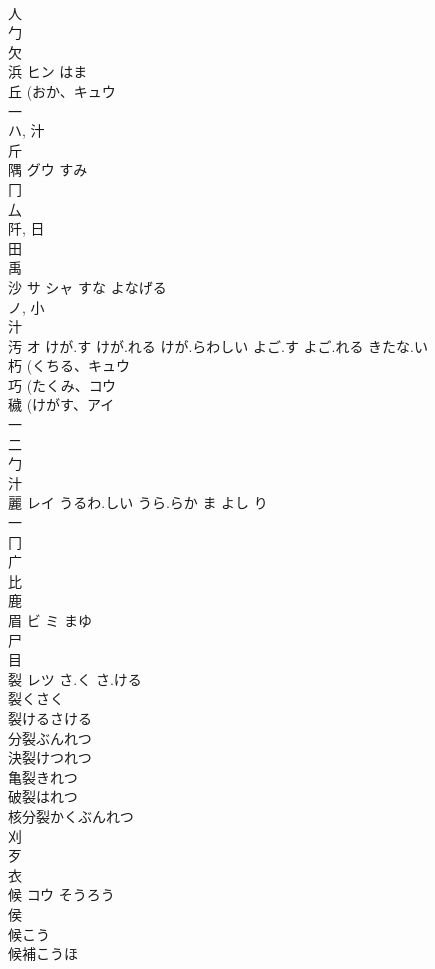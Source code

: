 \documentclass[8pt]{extreport}
\begin{document}
\begin{CJK}{UTF8}{min}
\\	人 
\\	勹 
\\	欠 
\\	浜	ヒン	はま	
\\	丘 (おか、キュウ 
\\	一 
\\	ハ, 汁 
\\	斤 
\\	隅	グウ	すみ	
\\	冂 
\\	厶 
\\	阡, 日 
\\	田 
\\	禹 
\\	沙	サ シャ	すな よなげる	
\\	ノ, 小 
\\	汁 
\\	汚	オ	けが.す けが.れる けが.らわしい よご.す よご.れる きたな.い	
\\	朽 (くちる、キュウ 
\\	巧 (たくみ、コウ 
\\	穢 (けがす、アイ 
\\	一 
\\	二 
\\	勹 
\\	汁 
\\	麗	レイ	うるわ.しい うら.らか ま よし り	
\\	一 
\\	冂 
\\	广 
\\	比 
\\	鹿 
\\	眉	ビ ミ	まゆ	
\\	尸 
\\	目 
\\	裂	レツ	さ.く さ.ける	
\\	裂くさく
\\	裂けるさける
\\	分裂ぶんれつ
\\	決裂けつれつ
\\	亀裂きれつ
\\	破裂はれつ
\\	核分裂かくぶんれつ
\\	刈 
\\	歹 
\\	衣 
\\	候	コウ	そうろう	
\\	侯 
\\	候こう
\\	候補こうほ

\end{CJK}
\end{document}
